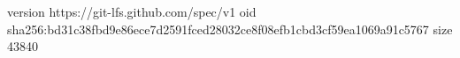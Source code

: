 version https://git-lfs.github.com/spec/v1
oid sha256:bd31c38fbd9e86ece7d2591fced28032ce8f08efb1cbd3cf59ea1069a91c5767
size 43840
